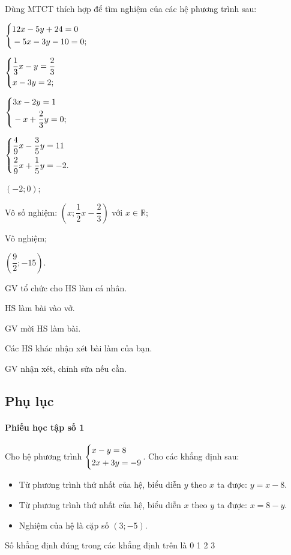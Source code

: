 \begin{baitap}[1.9]
    Dùng MTCT thích hợp để tìm nghiệm của các hệ phương trình sau:
    \begin{listEX}
        \item $\left\{\begin{aligned}&12x - 5y + 24 = 0 \\ &-5x - 3y - 10 = 0;\end{aligned}\right.$
        \item $\left\{\begin{aligned}&\frac{1}{3}x - y = \frac{2}{3} \\ &x - 3y = 2;\end{aligned}\right.$
        \item $\left\{\begin{aligned}&3x - 2y = 1 \\ &-x + \frac{2}{3}y = 0;\end{aligned}\right.$
        \item $\left\{\begin{aligned}&\frac{4}{9}x - \frac{3}{5}y = 11 \\ &\frac{2}{9}x + \frac{1}{5}y = -2.\end{aligned}\right.$
    \end{listEX}
    \doicot
    \huongdan
    \begin{listEX}
    	\item $(-2;0)$;
    	\item Vô số nghiệm: $\left(x;\dfrac{1}{2}x-\dfrac{2}{3}\right)$ với $x\in\mathbb{R}$;
    	\item Vô nghiệm;
    	\item $\left(\dfrac{9}{2};-15\right)$.
    \end{listEX}
\end{baitap}

\tochucthuchien

\begin{tcth}[baitap={từ 1.6 đến 1.9}]
	\buocmot
	\item GV tổ chức cho HS làm cá nhân.
	\buochai
	\item HS làm bài vào vở.
	\item GV mời HS làm bài.
	\buocba
	\item Các HS khác nhận xét bài làm của bạn.
	\buocbon
	\item GV nhận xét, chỉnh sửa nếu cần. 
\end{tcth}

\subsection{Phụ lục}

\paragraph{Phiếu học tập số 1}

\begin{ex}
Cho hệ phương trình $\left\{\begin{aligned}&x - y = 8 \\ &2x + 3y = -9\end{aligned}\right.$. Cho các khẳng định sau:
\begin{itemize}
    \item[(i)] Từ phương trình thứ nhất của hệ, biểu diễn $y$ theo $x$ ta được: $y = x - 8$.
    \item[(ii)] Từ phương trình thứ nhất của hệ, biểu diễn $x$ theo $y$ ta được: $x = 8 - y$.
    \item[(iii)] Nghiệm của hệ là cặp số $(3; -5)$.
\end{itemize}
Số khẳng định đúng trong các khẳng định trên là
\choice
{0}
{1}
{2}
{3}
\end{ex}

